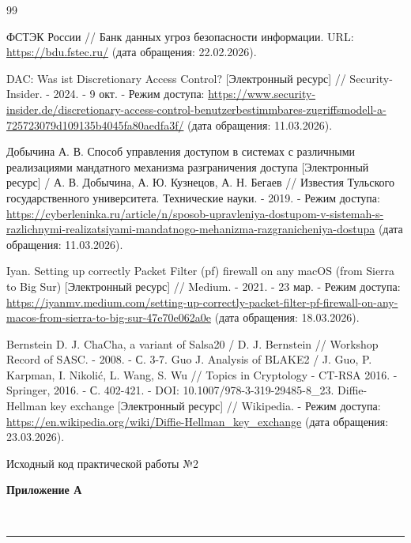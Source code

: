 \documentclass[areasetadvanced]{scrartcl}
\newcommand{\twosideheading}[2]{%
  \noindent
  \begin{minipage}[t]{0.5\textwidth}\raggedright\small #1\end{minipage}%
  \begin{minipage}[t]{0.5\textwidth}\raggedleft\Large\bfseries #2\end{minipage}\\[-0.2em]
  \hrule
  \vspace{0.8em}
}
\begin{document}
\newpage
{}
\begin{thebibliography}{99}

ФСТЭК России // Банк данных угроз безопасности информации. URL: \url{https://bdu.fstec.ru/} (дата обращения: 22.02.2026).

DAC: Was ist Discretionary Access Control? [Электронный ресурс] // Security-Insider. - 2024. - 9 окт. - Режим доступа: \url{https://www.security-insider.de/discretionary-access-control-benutzerbestimmbares-zugriffsmodell-a-725723079d109135b4045fa80aedfa3f/} (дата обращения: 11.03.2026).

Добычина А. В. Способ управления доступом в системах с различными реализациями мандатного механизма разграничения доступа [Электронный ресурс] / А. В. Добычина, А. Ю. Кузнецов, А. Н. Бегаев // Известия Тульского государственного университета. Технические науки. - 2019. - Режим доступа: \url{https://cyberleninka.ru/article/n/sposob-upravleniya-dostupom-v-sistemah-s-razlichnymi-realizatsiyami-mandatnogo-mehanizma-razgranicheniya-dostupa} (дата обращения: 11.03.2026).

Iyan. Setting up correctly Packet Filter (pf) firewall on any macOS (from Sierra to Big Sur) [Электронный ресурс] // Medium. - 2021. - 23 мар. - Режим доступа: \url{https://iyanmv.medium.com/setting-up-correctly-packet-filter-pf-firewall-on-any-macos-from-sierra-to-big-sur-47e70e062a0e} (дата обращения: 18.03.2026).

Bernstein D. J. ChaCha, a variant of Salsa20 / D. J. Bernstein // Workshop Record of SASC. - 2008. - С. 3-7.
Guo J. Analysis of BLAKE2 / J. Guo, P. Karpman, I. Nikolić, L. Wang, S. Wu // Topics in Cryptology - CT-RSA 2016. - Springer, 2016. - С. 402-421. - DOI: 10.1007/978-3-319-29485-8\_23.
Diffie-Hellman key exchange [Электронный ресурс] // Wikipedia. - Режим доступа: \url{https://en.wikipedia.org/wiki/Diffie-Hellman_key_exchange} (дата обращения: 23.03.2026).
\end{thebibliography}

\newpage
{}
\label{sec:pril2}
\twosideheading{Исходный код практической работы №2}{Приложение А}
\end{document}
